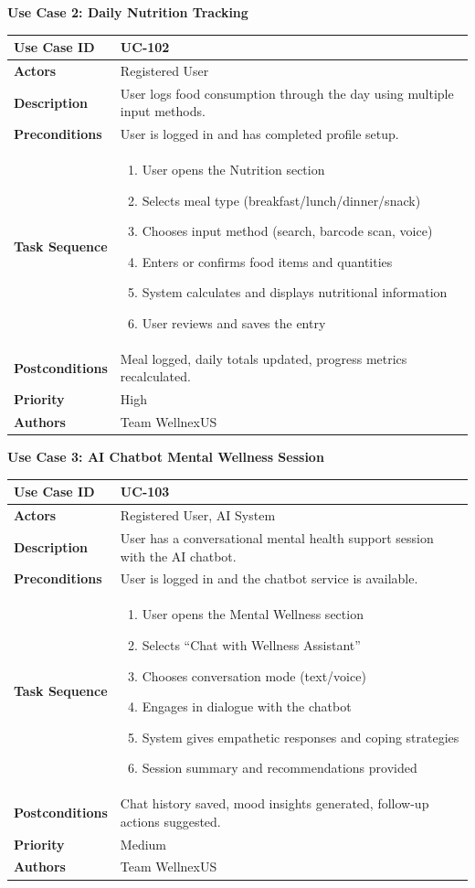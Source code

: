 \documentclass[11pt,a4paper]{report}
\newenvironment{usecase}[1]{\par\medskip\noindent\textbf{#1}\par\smallskip\small
 \begin{tabular}{|>{\bfseries}p{2.8cm}|p{11.8cm}|}\hline}{\end{tabular}\normalsize\par}
\begin{document}
\begin{usecase}{Use Case 2: Daily Nutrition Tracking}
Use Case ID & UC-102\\\hline
Actors & Registered User\\\hline
Description & User logs food consumption through the day using multiple input methods.\\\hline
Preconditions & User is logged in and has completed profile setup.\\\hline
Task Sequence & \begin{enumerate}[nosep,leftmargin=*]
 \item User opens the Nutrition section
 \item Selects meal type (breakfast/lunch/dinner/snack)
 \item Chooses input method (search, barcode scan, voice)
 \item Enters or confirms food items and quantities
 \item System calculates and displays nutritional information
 \item User reviews and saves the entry\end{enumerate}\\\hline
Postconditions & Meal logged, daily totals updated, progress metrics recalculated.\\\hline
Priority & High\\\hline Authors & Team WellnexUS\\\hline
\end{usecase}

\begin{usecase}{Use Case 3: AI Chatbot Mental Wellness Session}
Use Case ID & UC-103\\\hline
Actors & Registered User, AI System\\\hline
Description & User has a conversational mental health support session with the AI chatbot.\\\hline
Preconditions & User is logged in and the chatbot service is available.\\\hline
Task Sequence & \begin{enumerate}[nosep,leftmargin=*]
 \item User opens the Mental Wellness section
 \item Selects ``Chat with Wellness Assistant''
 \item Chooses conversation mode (text/voice)
 \item Engages in dialogue with the chatbot
 \item System gives empathetic responses and coping strategies
 \item Session summary and recommendations provided\end{enumerate}\\\hline
Postconditions & Chat history saved, mood insights generated, follow-up actions suggested.\\\hline
Priority & Medium\\\hline Authors & Team WellnexUS\\\hline
\end{usecase}
\end{document}

